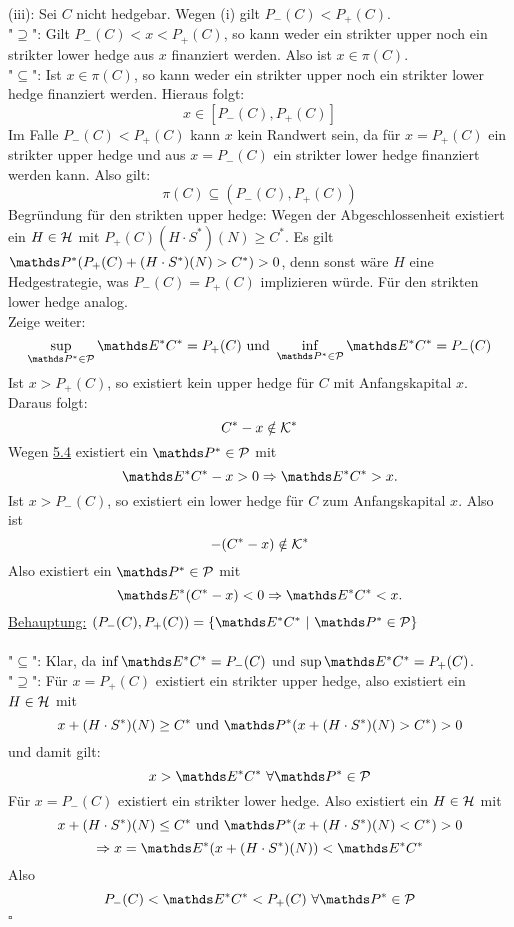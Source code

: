 (iii):
Sei $C$ nicht hedgebar.
Wegen (i) gilt $P_-(C)<P_+(C)$.\\
"$\supseteq$":
Gilt $P_-(C)<x<P_+(C)$, so kann weder ein strikter upper noch ein strikter lower hedge aus $x$ finanziert werden.
Also ist $x\in \pi(C)$.\\
"$\subseteq$":
Ist $x\in\pi(C)$, so kann weder ein strikter upper noch ein strikter lower hedge finanziert werden.
Hieraus folgt:
\[
x\in [P_-(C),P_+(C)]
\]
Im Falle $P_-(C)<P_+(C)$ kann $x$ kein Randwert sein, da für $x=P_+(C)$ ein strikter upper hedge und aus $x=P_-(C)$ ein strikter lower hedge finanziert werden kann.
Also gilt:
\[
\pi(C)\subseteq (P_-(C),P_+(C))
\]
Begründung für den strikten upper hedge:
Wegen der Abgeschlossenheit existiert ein $H\in\mathcal{H}$ mit $P_+(C)(H\cdot S^*)(N)\ge C^*$.
Es gilt $\Pw^*(P_+(C)+(H\cdot S^*)(N)>C^*)>0$, denn sonst wäre $H$ eine Hedgestrategie, was $P_-(C)=P_+(C)$ implizieren würde.
Für den strikten lower hedge analog.\\

Zeige weiter:
\[
\sup\limits_{\Pw^*\in\mc{P}}\E^*C^*=P_+(C) \text{ und } \inf\limits_{\Pw^*\in\mc{P}}\E^*C^*=P_-(C)
\]
Ist $x>P_+(C)$, so existiert kein upper hedge für $C$ mit Anfangskapital $x$.
Daraus folgt:
\[
C^*-x\notin \mathcal{K}^*
\]
Wegen \hyperref[sub:]{5.4} existiert ein $\Pw^*\in\mc{P}$ mit
\[
\E^*C^*-x>0\Rightarrow \E^*C^*>x.
\]
Ist $x>P_-(C)$, so existiert ein lower hedge für $C$ zum Anfangskapital $x$.
Also ist
\[
-(C^*-x)\notin \mathcal{K}^*
\]
Also existiert ein $\Pw^*\in\mc{P}$ mit 
\[
\E^*(C^*-x)<0 \Rightarrow \E^*C^*<x.
\]
\uline{Behauptung:}
$(P_-(C),P_+(C))=\penbrace{\E^*C^*~|~\Pw^*\in\mc{P}}$\\

\\
"$\subseteq$":
Klar, da $\inf \E^*C^*=P_-(C)$ und $\sup\E^*C^*=P_+(C)$.\\
"$\supseteq$":
Für $x=P_+(C)$ existiert ein strikter upper hedge, also existiert ein $H\in\mathcal{H}$ mit 
\[
x+(H\cdot S^*)(N)\ge C^* \text{ und }\Pw^*(x+(H\cdot S^*)(N)>C^*)>0
\]
und damit gilt:
\[
x>\E^*C^*~\forall \Pw^*\in\mc{P}
\]
Für $x=P_-(C)$ existiert ein strikter lower hedge.
Also existiert ein $H\in\mathcal{H}$ mit
\[
x+(H\cdot S^*)(N)\le C^* \text{ und } \Pw^*(x+(H\cdot S^*)(N)<C^*)>0
\]
\[
\Rightarrow x=\E^*(x+(H\cdot S^*)(N))<\E^*C^*
\]
Also
\[
P_-(C)<\E^*C^*<P_+(C)~\forall \Pw^*\in\mc{P}
\]
\hfill $\square$















\cleardoubleoddemptypage
{}
\setcounter{page}{1}


\printindex
\listoffigures
